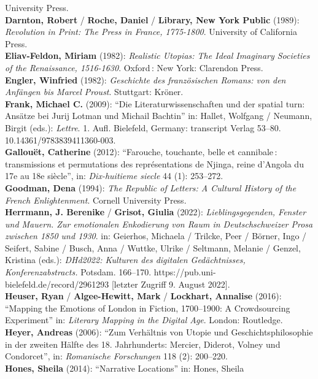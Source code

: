 \documentclass[
  12pt,
  letterpaper,
  DIV=11,
  numbers=noendperiod]{scrreprt}
\begin{document}
University Press.\\
\textbf{Darnton, Robert} / \textbf{Roche, Daniel} / \textbf{Library, New
York Public} (1989): \emph{Revolution in Print: The Press in France,
1775-1800}. University of California Press.\\
\textbf{Eliav-Feldon, Miriam} (1982): \emph{Realistic Utopias: The Ideal
Imaginary Societies of the Renaissance, 1516-1630}. Oxford\,: New York:
Clarendon Press.\\
\textbf{Engler, Winfried} (1982): \emph{Geschichte des französischen
Romans: von den Anfängen bis Marcel Proust}. Stuttgart: Kröner.\\
\textbf{Frank, Michael C.} (2009): ``Die Literaturwissenschaften und der
spatial turn: Ansätze bei Jurij Lotman und Michail Bachtin'' in: Hallet,
Wolfgang / Neumann, Birgit (eds.): \emph{Lettre}. 1. Aufl. Bielefeld,
Germany: transcript Verlag 53--80. 10.14361/9783839411360-003.\\
\textbf{Gallouët, Catherine} (2012): ``Farouche, touchante, belle et
cannibale\,: transmissions et permutations des représentations de
Njinga, reine d'Angola du 17e au 18e siècle'', in: \emph{Dix-huitieme
siecle} 44 (1): 253--272.\\
\textbf{Goodman, Dena} (1994): \emph{The Republic of Letters: A Cultural
History of the French Enlightenment}. Cornell University Press.\\
\textbf{Herrmann, J. Berenike} / \textbf{Grisot, Giulia} (2022):
\emph{Lieblingsgegenden, Fenster und Mauern. Zur emotionalen Enkodierung
von Raum in Deutschschweizer Prosa zwischen 1850 und 1930}. in:
Geierhos, Michaela / Trilcke, Peer / Börner, Ingo / Seifert, Sabine /
Busch, Anna / Wuttke, Ulrike / Seltmann, Melanie / Genzel, Kristina
(eds.): \emph{DHd2022: Kulturen des digitalen Gedächtnisses,
Konferenzabstracts.} Potsdam. 166--170.
https://pub.uni-bielefeld.de/record/2961293 {[}letzter Zugriff 9. August
2022{]}.\\
\textbf{Heuser, Ryan} / \textbf{Algee-Hewitt, Mark} / \textbf{Lockhart,
Annalise} (2016): ``Mapping the Emotions of London in Fiction,
1700--1900: A Crowdsourcing Experiment'' in: \emph{Literary Mapping in
the Digital Age}. London: Routledge.\\
\textbf{Heyer, Andreas} (2006): ``Zum Verhältnis von Utopie und
Geschichtsphilosophie in der zweiten Hälfte des 18. Jahrhunderts:
Mercier, Diderot, Volney und Condorcet'', in: \emph{Romanische
Forschungen} 118 (2): 200--220.\\
\textbf{Hones, Sheila} (2014): ``Narrative Locations'' in: Hones, Sheila
\end{document}
